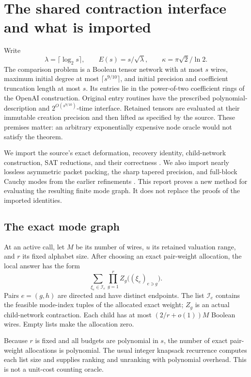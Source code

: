 \section{The shared contraction interface and what is imported}
\label{sec:interface}

Write
\[
 \lambda=\lceil\log_2 s\rceil,\qquad E(s)=s/\sqrt\lambda,
 \qquad \kappa=\pi\sqrt2/\ln2.
\]
The comparison problem is a Boolean tensor network with at most $s$ wires,
maximum initial degree at most $\lceil s^{9/10}\rceil$, and initial
precision and coefficient truncation length at most $s$. Its entries lie
in the power-of-two coefficient rings of the OpenAI construction. Original
entry routines have the prescribed polynomial-description and
$2^{O(s^{9/10})}$-time interface. Retained tensors are evaluated at their
immutable creation precision and then lifted as specified by the source.
These premises matter: an arbitrary exponentially expensive node oracle
would not satisfy the theorem.

We import the source's exact deformation, recovery identity, child-network
construction, SAT reductions, and their correctness
\cite{openai,contraction}. We also import nearly lossless asymmetric packet
packing, the sharp tapered precision, and full-block Cauchy modes from the
earlier refinements \cite{asymmetric,precision,joint,adaptive,tree}.
This report proves a new method for evaluating the resulting finite mode
graph. It does not replace the proofs of the imported identities.

\subsection{The exact mode graph}

At an active call, let $M$ be its number of wires, $u$ its retained
valuation range, and $r$ its fixed alphabet size. After choosing an exact
pair-weight allocation, the local answer has the form
\begin{equation}\label{eq:modegraph}
 \sum_{\xi_e\in\mathcal I_e}\prod_{g=1}^{r}
    Z_g\bigl((\xi_e)_{e\ni g}\bigr).
\end{equation}
Pairs $e=(g,h)$ are directed and have distinct endpoints. The list
$\mathcal I_e$ contains the feasible mode-index tuples of the allocated
exact weight; $Z_g$ is an actual child-network contraction. Each child has
at most $(2/r+o(1))M$ Boolean wires. Empty lists make the allocation zero.

Because $r$ is fixed and all budgets are polynomial in $s$, the number of
exact pair-weight allocations is polynomial. The usual integer knapsack
recurrence computes each list size and supplies ranking and unranking with
polynomial overhead. This is not a unit-cost counting oracle.

